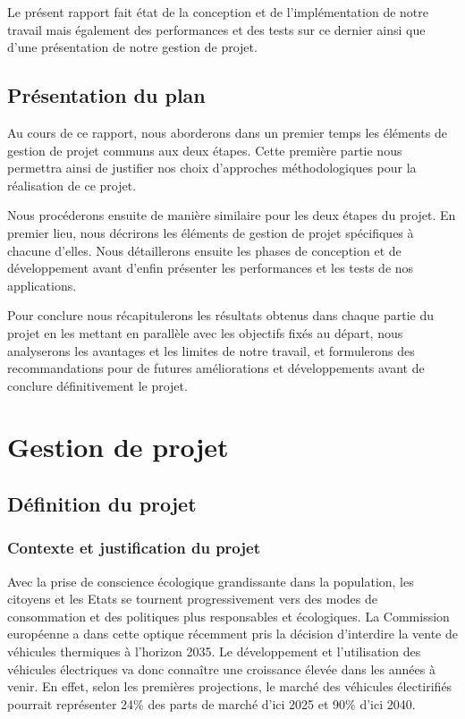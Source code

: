 \documentclass[a4paper, 12pt]{report}
\begin{document}
\bigskip
Le présent rapport fait état de la conception et de l'implémentation de notre travail mais également des performances et des tests sur ce dernier ainsi que d'une présentation de notre gestion de projet.

\section{Présentation du plan}

Au cours de ce rapport, nous aborderons dans un premier temps les éléments de gestion de projet communs aux deux étapes. Cette première partie nous permettra ainsi de justifier nos choix d'approches méthodologiques pour la réalisation de ce projet.
\bigskip

Nous procéderons ensuite de manière similaire pour les deux étapes du projet. En premier lieu, nous décrirons les éléments de gestion de projet spécifiques à chacune d'elles. Nous détaillerons ensuite les phases de conception et de développement avant d'enfin présenter les performances et les tests de nos applications.
\bigskip


Pour conclure nous récapitulerons les résultats obtenus dans chaque partie du projet en les mettant en parallèle avec les objectifs fixés au départ, nous analyserons les avantages et les limites de notre travail, et formulerons des recommandations pour de futures améliorations et développements avant de conclure définitivement le projet.


\chapter{Gestion de projet}
\minitoc
{}
\clearpage
\section{Définition du projet}

\subsection{Contexte et justification du projet}

Avec la prise de conscience écologique grandissante dans la population, les citoyens et les Etats se tournent progressivement vers des modes de consommation et des politiques plus responsables et écologiques. La Commission européenne a dans cette optique récemment pris la décision d'interdire la vente de véhicules thermiques à l'horizon 2035. Le développement et l'utilisation des véhicules électriques va donc connaître une croissance élevée dans les années à venir. En effet, selon les premières projections\footnotemark[1], le marché des véhicules électirifiés pourrait représenter 24\% des parts de marché d'ici 2025 et 90\% d'ici 2040.
\bigskip
{}
\end{document}
